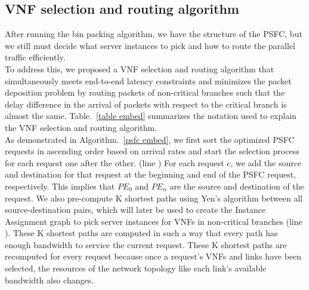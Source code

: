 \documentclass[journal]{IEEEtran}
\begin{document}

\subsection{VNF selection and routing algorithm}
After running the bin packing algorithm, we have the structure of the PSFC, but we still must decide what server instances to pick and how to route the parallel traffic efficiently. \\ 
To address this, we proposed a VNF selection and routing algorithm that simultaneously meets end-to-end latency constraints and minimizes the packet deposition problem by routing packets of non-critical branches such that the delay difference in the arrival of packets with respect to the critical branch is almost the same.
Table.~\ref{table embed} summarizes the notation used to explain the VNF selection and routing algorithm. \\ As demonstrated in Algorithm.~\ref{psfc embed}, we first sort the optimized PSFC requests in ascending order based on arrival rates and start the selection process for each request one after the other. (line )  
For each request $c$, we add the source and destination for that request at the beginning and end of the PSFC request, respectively. This implies that $PE_0$ and $PE_n$ are the source and destination of the request. We also pre-compute K shortest paths using Yen's algorithm between all source-destination pairs, which will later be used to create the Instance Assignment graph to pick server instances for VNFs in non-critical branches (line ). These K shortest paths are computed in such a way that every path has enough bandwidth to service the current request. These K shortest paths are recomputed for every request because once a request's VNFs and links have been selected, the resources of the network topology like each link's available bandwidth also changes. 
\end{document}
